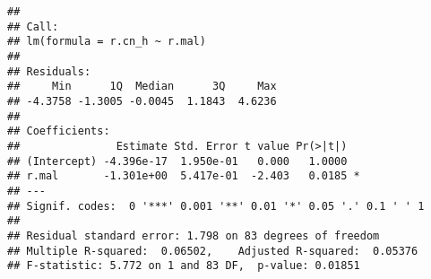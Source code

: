 \documentclass[]{article}
\newenvironment{Shaded}{\begin{snugshade}}{\end{snugshade}}
\newcommand{\KeywordTok}[1]{\textcolor[rgb]{0.13,0.29,0.53}{\textbf{#1}}}
\newcommand{\DataTypeTok}[1]{\textcolor[rgb]{0.13,0.29,0.53}{#1}}
\newcommand{\DecValTok}[1]{\textcolor[rgb]{0.00,0.00,0.81}{#1}}
\newcommand{\StringTok}[1]{\textcolor[rgb]{0.31,0.60,0.02}{#1}}
\newcommand{\OperatorTok}[1]{\textcolor[rgb]{0.81,0.36,0.00}{\textbf{#1}}}
\newcommand{\NormalTok}[1]{#1}
\begin{document}
\begin{Shaded}
\end{Shaded}

\begin{verbatim}
## 
## Call:
## lm(formula = r.cn_h ~ r.mal)
## 
## Residuals:
##     Min      1Q  Median      3Q     Max 
## -4.3758 -1.3005 -0.0045  1.1843  4.6236 
## 
## Coefficients:
##               Estimate Std. Error t value Pr(>|t|)  
## (Intercept) -4.396e-17  1.950e-01   0.000   1.0000  
## r.mal       -1.301e+00  5.417e-01  -2.403   0.0185 *
## ---
## Signif. codes:  0 '***' 0.001 '**' 0.01 '*' 0.05 '.' 0.1 ' ' 1
## 
## Residual standard error: 1.798 on 83 degrees of freedom
## Multiple R-squared:  0.06502,    Adjusted R-squared:  0.05376 
## F-statistic: 5.772 on 1 and 83 DF,  p-value: 0.01851
\end{verbatim}
\end{document}

